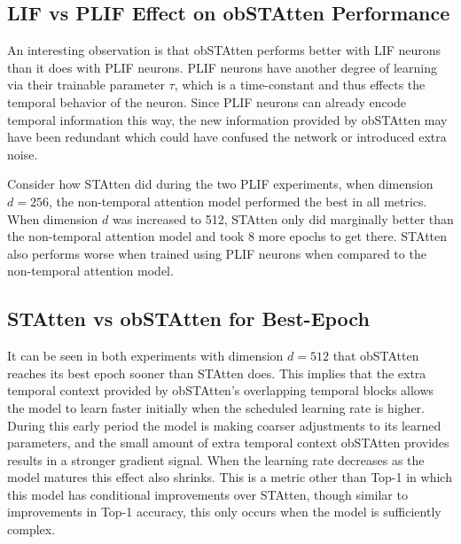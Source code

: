 \documentclass[../main.tex]{subfiles}
\begin{document}
\subsection{LIF vs PLIF Effect on obSTAtten Performance}
An interesting observation is that obSTAtten performs better with LIF neurons than it does with PLIF neurons. PLIF neurons have another degree of learning via their trainable parameter $\tau$, which is a time-constant and thus effects the temporal behavior of the neuron\cite{plif}. Since PLIF neurons can already encode temporal information this way, the new information provided by obSTAtten may have been redundant which could have confused the network or introduced extra noise.

\par Consider how STAtten did during the two PLIF experiments, when dimension $d=256$, the non-temporal attention model performed the best in all metrics. When dimension $d$ was increased to 512, STAtten only did marginally better than the non-temporal attention model and took 8 more epochs to get there. STAtten also performs worse when trained using PLIF neurons when compared to the non-temporal attention model.

\subsection{STAtten vs obSTAtten for Best-Epoch}
It can be seen in both experiments with dimension $d=512$ that obSTAtten reaches its best epoch sooner than STAtten does. This implies that the extra temporal context provided by obSTAtten's overlapping temporal blocks allows the model to learn faster initially when the scheduled learning rate is higher\cite{STAtten}. During this early period the model is making coarser adjustments to its learned parameters, and the small amount of extra temporal context obSTAtten provides results in a stronger gradient signal. When the learning rate decreases as the model matures this effect also shrinks. This is a metric other than Top-1 in which this model has conditional improvements over STAtten, though similar to improvements in Top-1 accuracy, this only occurs when the model is sufficiently complex.
\end{document}
